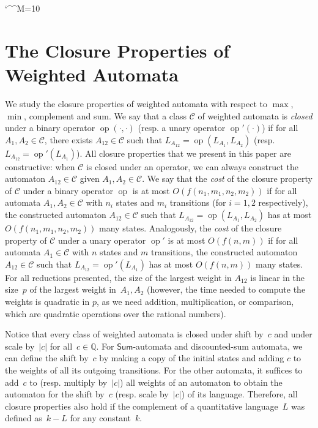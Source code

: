 \documentclass{llncs}
\makeatletter
\def\abs#1{\ensuremath{\lvert #1\rvert}}
\newcommand{\rat}{{\mathbb Q}}
\newcommand{\C}{\mathcal{C}}
\newcommand{\Sum}{\mathsf{Sum}}
\DeclareMathOperator{\op}{op}
\def\@comment{\let\do\@makeother \dospecials\catcode`\^^M=10\def\par{}}
\def\begincomment{\@comment\@xcomment}
\newenvironment{comment}{\begincomment}{}
\makeatother
\begin{document}
\begin{comment}
\end{comment}











\section{The Closure Properties of Weighted Automata}\label{sec:closure-properties}


We study the closure properties of weighted automata
with respect to $\max$, $\min$, complement and sum. We say that a class $\C$ of weighted
automata is \emph{closed} under a binary operator $\op(\cdot,\cdot)$ 
(resp. a unary operator $\op'(\cdot)$) if for all $A_1,A_2 \in \C$,
there exists $A_{12} \in \C$ such that $L_{A_{12}} = \op(L_{A_1},L_{A_2})$
(resp. $L_{A_{12}} = \op'(L_{A_1})$).
All closure properties that we present in this paper are constructive:
when $\C$ is closed under an operator,
we can always construct the automaton $A_{12} \in \C$ given $A_1,A_2 \in \C$.
We say that the \emph{cost} of the closure property of $\C$ under a binary operator $\op$ 
is at most $O(f(n_1,m_1,n_2,m_2))$ if 
for all automata $A_1,A_2 \in \C$ with $n_i$ states and $m_i$ transitions (for $i=1,2$ respectively),
the constructed automaton $A_{12} \in \C$ such that $L_{A_{12}} = \op(L_{A_1},L_{A_2})$
has at most $O(f(n_1,m_1,n_2,m_2))$ many states.
Analogously, the \emph{cost} of the closure property of $\C$ under a unary operator $\op'$ 
is at most $O(f(n,m))$ if 
for all automata $A_1 \in \C$ with $n$ states and $m$ transitions,
the constructed automaton $A_{12} \in \C$ such that $L_{A_{12}} = \op'(L_{A_1})$
has at most $O(f(n,m))$ many states.
For all reductions presented, the size of the largest weight in $A_{12}$ 
is linear in the size~$p$ of the largest weight in~$A_1,A_2$ (however, 
the time needed to compute the weights is quadratic in $p$,
as we need addition, multiplication, or comparison, which are quadratic operations
over the rational numbers).



Notice that every class of weighted automata is closed under shift by~$c$ and
under scale by~$\abs{c}$ for all~$c \in \rat$. For $\Sum$-automata
and discounted-sum automata, we can define the shift by~$c$ by making a copy of the initial
states and adding $c$ to the weights of all its outgoing transitions.
For the other automata, it suffices to add~$c$
to (resp. multiply by~$\abs{c}$) all weights of an automaton to obtain the
automaton for the shift by~$c$ (resp. scale by~$\abs{c}$) of its language. 
Therefore, all closure properties also hold if the complement of a 
quantitative language~$L$ was defined as~$k-L$ for any constant~$k$.
\end{document}
